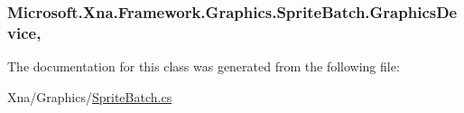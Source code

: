\subsubsection[{Graphics\+Device}]{ Microsoft.\+Xna.\+Framework.\+Graphics.\+Sprite\+Batch.\+Graphics\+Device\hspace{0.3cm}{\ttfamily [get]}, {\ttfamily [set]}}\label{class_microsoft_1_1_xna_1_1_framework_1_1_graphics_1_1_sprite_batch_a06fbd9cf615a270a16ec1b87e205c603}


The documentation for this class was generated from the following file\+:\begin{DoxyCompactItemize}
\item 
Xna/\+Graphics/\hyperlink{_sprite_batch_8cs}{Sprite\+Batch.\+cs}\end{DoxyCompactItemize}
